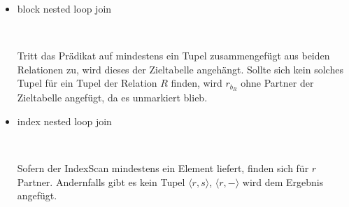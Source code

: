 \documentclass{uni_tue_template}
\begin{document}
\begin{itemize}
	\item block nested loop join\\
		\begin{function}[H]
		\Function{\FFunction{\R, \S, \p}}\\
		\end{function}
		Tritt das Prädikat auf mindestens ein Tupel zusammengefügt aus beiden Relationen zu, wird dieses der Zieltabelle angehängt. Sollte sich kein solches Tupel für ein Tupel der Relation $R$ finden, wird $r_{b_R}$ ohne Partner der Zieltabelle angefügt, da es unmarkiert blieb.
	\item index nested loop join\\
   		\begin{function}[H]
		\Function{\FFunction{\R, \S, \p}}\\
   		\end{function}
   		Sofern der IndexScan mindestens ein Element liefert, finden sich für $r$ Partner. Andernfalls gibt es kein Tupel $\langle r, s\rangle$, $\langle r,-\rangle$ wird dem Ergebnis angefügt.
	\end{itemize}
%
\newpage
%
\exercise{}
%
\newpage
%
\exercise{}
	\item
\end{document}
